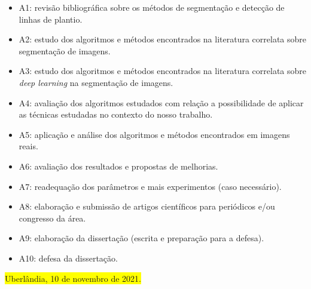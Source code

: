 \documentclass[12pt, a4paper, english, brazil]{article}
\newcommand{\boxYellow}[1]{\colorbox{yellow}{#1}}
\begin{document}
\begin{itemize}
    \item A1: revisão bibliográfica sobre os métodos de segmentação e detecção de linhas de plantio.
    \item A2: estudo dos algoritmos e métodos encontrados na literatura correlata sobre segmentação de imagens.
    \item A3: estudo dos algoritmos e métodos encontrados na literatura correlata sobre \textit{deep learning} na segmentação de imagens.
    \item A4: avaliação dos algoritmos estudados com relação a possibilidade de aplicar as técnicas estudadas no contexto do nosso trabalho.
    \item A5: aplicação e análise dos algoritmos e métodos encontrados em imagens reais.
    \item A6: avaliação dos resultados e propostas de melhorias.
    \item A7: readequação dos parâmetros e mais experimentos (caso necessário).
    \item A8: elaboração e submissão de artigos científicos para periódicos e/ou congresso da área.
    \item A9: elaboração da dissertação (escrita e preparação para a defesa).
    \item A10: defesa da dissertação.
\end{itemize}



\bigskip
\noindent \boxYellow{Uberlândia, 10 de novembro de 2021.}


\end{document}

